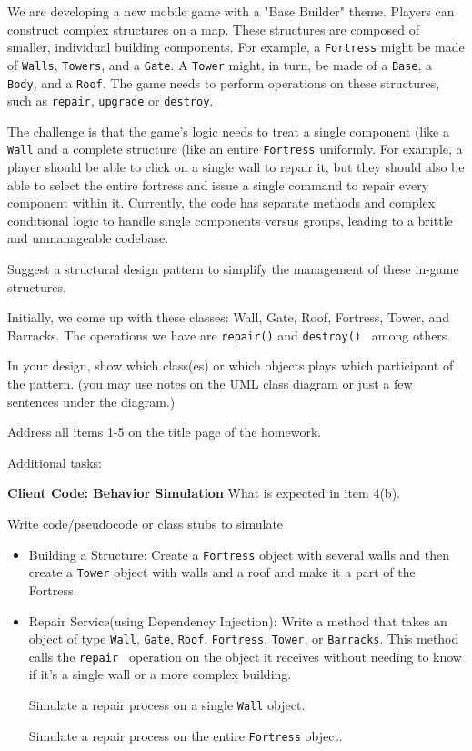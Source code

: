 \question[14]

We are developing a new mobile game with a "Base Builder" theme. 
Players can construct complex structures on a map. These structures are composed of smaller, individual building components.
For example, a {\tt Fortress} might be made of {\tt Walls}, {\tt Towers}, and a {\tt Gate}. 
A {\tt Tower} might, in turn, be made of a 
{\tt Base}, a {\tt Body}, and a {\tt Roof}.
	The game needs to perform operations on these structures, such as 
{\tt repair}, {\tt upgrade} or {\tt destroy}.

The challenge is that the game's logic needs to treat a single component (like a 
{\tt Wall} and a complete structure (like an entire 
{\tt Fortress} uniformly. 
For example, a player should be able to click on a single wall to repair it, but they should also be able to select the entire fortress and issue a single command to repair every component within it. Currently, the code has separate methods and complex conditional logic to handle single components versus groups, leading to a brittle and unmanageable codebase.


Suggest a structural design pattern 
to simplify the management of these in-game structures.

Initially, we come up with these classes:  Wall, Gate, Roof, Fortress, Tower, and Barracks.
The operations we have are 
{\tt repair()} and {\tt destroy() } among others.

In your design, 
show which class(es) or which objects plays which participant of the pattern.
(you may use notes on the UML class diagram or just a few sentences under the diagram.)

Address all items 1-5 on the title page of the homework.

Additional tasks:

{\bf Client Code: Behavior Simulation} 
What is expected in item 4(b).

Write code/pseudocode or class stubs to simulate 


\begin{itemize}
\item
	Building a Structure: Create a {\tt Fortress} object with several walls and then
		create a {\tt Tower} object with walls and a roof and make it a part of the Fortress.

\item

Repair Service(using Dependency Injection):
Write a method that takes an object of type 
		{\tt Wall}, {\tt Gate}, {\tt Roof}, {\tt Fortress}, {\tt Tower}, or {\tt Barracks}.
		This method calls the {\tt repair }
	operation on the object it receives 
without needing to know if it's a single wall or a more complex building.

		Simulate a repair process on a single {\tt Wall} object.

		Simulate a repair process on the entire {\tt Fortress} object.

\end{itemize}


